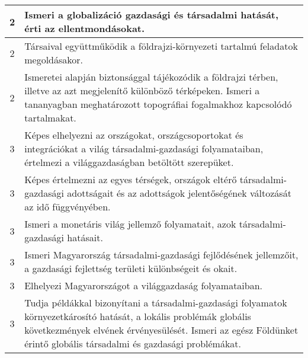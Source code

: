 \begin{longtable}{c | p{} }
                                
                                          2 &  Ismeri a globalizáció gazdasági és társadalmi hatását, érti az ellentmondásokat. \\ \hline
                                          2 &  Társaival együttműködik a földrajzi-környezeti tartalmú feladatok megoldásakor. \\ \hline
                                          2 &  Ismeretei alapján biztonsággal tájékozódik a földrajzi térben, illetve az azt megjelenítő különböző térképeken. Ismeri a tananyagban meghatározott topográfiai fogalmakhoz kapcsolódó tartalmakat. \\ \hline
                                      
                                
                                          3 &  Képes elhelyezni az országokat, országcsoportokat és integrációkat a világ társadalmi-gazdasági folyamataiban, értelmezi a világgazdaságban betöltött szerepüket. \\ \hline
                                          3 &  Képes értelmezni az egyes térségek, országok eltérő társadalmi-gazdasági adottságait és az adottságok jelentőségének változását az idő függvényében. \\ \hline
                                          3 &  Ismeri a monetáris világ jellemző folyamatait, azok társadalmi-gazdasági hatásait. \\ \hline
                                          3 &  Ismeri Magyarország társadalmi-gazdasági fejlődésének jellemzőit, a gazdasági fejlettség területi különbségeit és okait. \\ \hline
                                          3 &  Elhelyezi Magyarországot a világgazdaság folyamataiban. \\ \hline
                                          3 &  Tudja példákkal bizonyítani a társadalmi-gazdasági folyamatok környezetkárosító hatását, a lokális problémák globális következmények elvének érvényesülését. Ismeri az egész Földünket érintő globális társadalmi és gazdasági problémákat. \\ \hline
                                      

\end{longtable}
